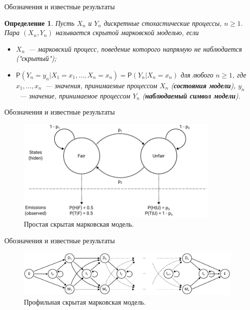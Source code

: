 \documentclass{beamer}
\newtheorem{defenition}{Определение}
\begin{document}
	\begin{frame}{Обозначения и известные результаты}
		\begin{defenition}
			Пусть $X_{n}$ и $Y_{n}$ дискретные стохастические процессы, $n \geq 1$. Пара $(X_{n}, Y_{n})$ называется скрытой марковской моделью, если
			\begin{itemize}
				\item $X_{n}$~--- марковский процесс, поведение которого напрямую не наблюдается ("скрытый");
				\item $\mathsf{P}(Y_{n} = y_{n}|X_{1} = x_{1},\dots, X_{n} = x_{n}) = \mathsf{P}(Y_{n}|X_{n}=x_{n})$ для любого $n \geq 1$, где $x_{1},\dots,x_{n}$~--- значения, принимаемые процессом  $X_{n}$ (\textbf{состояния модели}), $ y_{n}$~--- значение, принимаемое процессом $Y_{n}$ (\textbf{наблюдаемый символ модели}).
			\end{itemize}
		\end{defenition}		
	\end{frame}

	\begin{frame}{Обозначения и известные результаты}
		\begin{figure}[h]
			\includegraphics[width=10cm]{../report/figure1}
			\caption{Простая скрытая марковская модель.} \label{fg:2}
		\end{figure}
	\end{frame}

	\begin{frame}{Обозначения и известные результаты}
		\begin{figure}[h]
			\includegraphics[width=12cm]{../report/figure2}
			\caption{Профильная скрытая марковская модель.}  \label{fg:3}
		\end{figure}		
	\end{frame}
\end{document}
